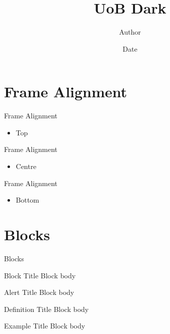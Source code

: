 \documentclass[
aspectratio=169
]{beamer}
\title{UoB Dark}
\date{Date}
\author{Author}
\begin{document}
	
	\begin{frame}
		\titlepage
	\end{frame}
	
	\section{Frame Alignment}
	
	\begin{frame}[t]{Frame Alignment}
		\begin{itemize}
			\item Top
		\end{itemize}
	\end{frame}
	\begin{frame}[c]{Frame Alignment}
		\begin{itemize}
			\item Centre
		\end{itemize}
	\end{frame}
	\begin{frame}[b]{Frame Alignment}
		\begin{itemize}
			\item Bottom
		\end{itemize}
	\end{frame}
	
	\section{Blocks}
	
	\begin{frame}{Blocks}
		\begin{block}{Block Title}
			Block body
		\end{block}
		\begin{alertblock}{Alert Title}
			Block body
		\end{alertblock}
		\begin{definition}{Definition Title}
			Block body
		\end{definition}
		\begin{example}{Example Title}
			Block body
		\end{example}
	\end{frame}
	
\end{document}
